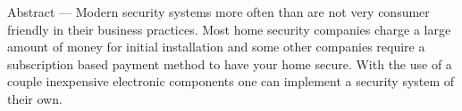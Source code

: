 {\small\bf
	\par Abstract — Modern security systems more often than are not very consumer friendly in their business practices. Most home security companies charge a large amount of money for initial installation and some other companies require a subscription based payment method to have your home secure. With the use of a couple inexpensive electronic components one can implement a security system of their own. 
}